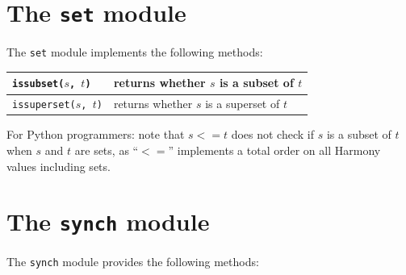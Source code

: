 \documentclass{report}
\begin{document}
\section{The \texttt{set} module}
\label{ap:set}

The \texttt{set} module
%
implements the following methods:

\vspace{1em}
\begin{tabular}{|l|l|}
\hline
\texttt{issubset($s$, $t$)} & returns whether $s$ is a subset of $t$ \\
\hline
\texttt{issuperset($s$, $t$)} & returns whether $s$ is a superset of $t$ \\
\hline
\end{tabular}

\vspace{1em}
For Python programmers: note that $s <= t$ does not check if $s$ is a subset of
$t$ when $s$ and $t$ are sets, as ``$<=$'' implements a total order on all Harmony values
including sets.

\section{The \texttt{synch} module}

%
The \texttt{synch} module provides the following methods:
\end{document}
